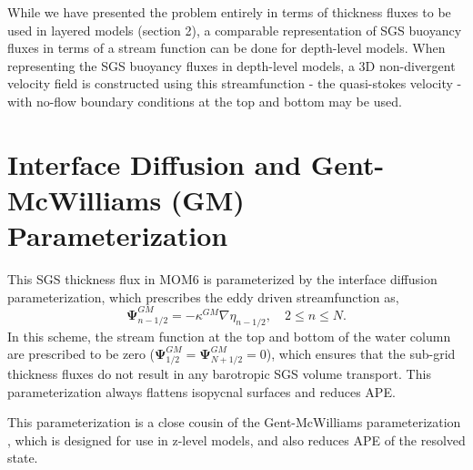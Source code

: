 \documentclass[draft,ms]{agutexSI2019}
\begin{document}
\begin{article}
While we have presented the problem entirely in terms of thickness fluxes to be used in layered models (section 2), a comparable representation of SGS buoyancy fluxes in terms of a stream function can be done for depth-level models. When representing the SGS buoyancy fluxes in depth-level models, a 3D non-divergent velocity field is constructed using this streamfunction - the quasi-stokes velocity - with no-flow boundary conditions at the top and bottom may be used.  

\section{Interface Diffusion and Gent-McWilliams (GM) Parameterization}
\label{app:GM_param}
This SGS thickness flux in MOM6 is parameterized by the interface diffusion parameterization, which prescribes the eddy driven streamfunction as,
\begin{equation}
    \mathbf{\Psi}^{GM}_{n-1/2} = - \kappa^{GM} \nabla \eta_{n-1/2}, \quad 2 \leq n \leq N.
    \label{eqn:GM_streamfunction}
\end{equation}
In this scheme, the stream function at the top and bottom of the water column are prescribed to be zero ($\mathbf{\Psi}^{GM}_{1/2} = \mathbf{\Psi}^{GM}_{N+1/2} = 0$), which ensures that the sub-grid thickness fluxes do not result in any barotropic SGS volume transport. This parameterization always flattens isopycnal surfaces and reduces APE.  

This parameterization is a close cousin of the Gent-McWilliams parameterization \cite{gent1990isopycnal, gent1995parameterizing}, which is designed for use in z-level models, and also reduces APE of the resolved state. 






\end{article}
\end{document}
